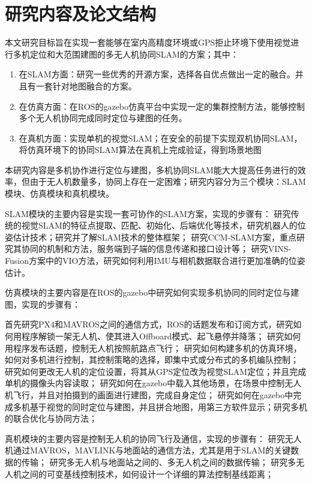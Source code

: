 \section{研究内容及论文结构}
本文研究目标旨在实现一套能够在室内高精度环境或GPS拒止环境下使用视觉进行多机定位和大范围建图的多无人机协同SLAM的方案；其中：

\begin{enumerate}
	\item 在SLAM方面：研究一些优秀的开源方案，选择各自优点做出一定的融合。并且有一套针对地图融合的方案。
	\item 在仿真方面：在ROS的gazebo仿真平台中实现一定的集群控制方法，能够控制多个无人机协同完成同时定位与建图的任务。
	\item 在真机方面：实现单机的视觉SLAM；在安全的前提下实现双机协同SLAM，将仿真环境下的协同SLAM算法在真机上完成验证，得到场景地图
\end{enumerate}

本研究内容是多机协作进行定位与建图，多机协同SLAM能大大提高任务进行的效率，但由于无人机数量多，协同上存在一定困难；研究内容分为三个模块：SLAM模块、仿真模块和真机模块。

SLAM模块的主要内容是实现一套可协作的SLAM方案，实现的步骤有：
研究传统的视觉SLAM的特征点提取、匹配、初始化、后端优化等技术，研究机器人的位姿估计技术；研究并了解SLAM技术的整体框架；
研究CCM-SLAM方案，重点研究其协同的机制和方法，服务端到子端的信息传递和接口设计等；
研究VINS-Fusion方案中的VIO方法，研究如何利用IMU与相机数据联合进行更加准确的位姿估计。

仿真模块的主要内容是在ROS的gazebo中研究如何实现多机协同的同时定位与建图，实现的步骤有：

首先研究PX4和MAVROS之间的通信方式，ROS的话题发布和订阅方式，研究如何用程序解锁一架无人机、使其进入Offboard模式、起飞悬停并降落；
研究如何用程序发布话题，控制无人机按照航路点飞行；
研究如何构建多机的仿真环境，如何对多机进行控制，其控制策略的选择，即集中式或分布式的多机编队控制；
研究如何更改无人机的定位设置，将其从GPS定位改为视觉SLAM定位；并且完成单机的摄像头内容读取；
研究如何在gazebo中载入其他场景，在场景中控制无人机飞行，并且对拍摄到的画面进行建图，完成自身定位；
研究如何在gazebo中完成多机基于视觉的同时定位与建图，并且拼合地图，用第三方软件显示；研究多机的联合优化与协同方法；

真机模块的主要内容是控制无人机的协同飞行及通信，实现的步骤有：
研究无人机通过MAVROS，MAVLINK与地面站的通信方法，尤其是用于SLAM的关键数据的传输；
研究多无人机与地面站之间的、多无人机之间的数据传输；
研究多无人机之间的可变基线控制技术，如何设计一个详细的算法控制基线距离；


